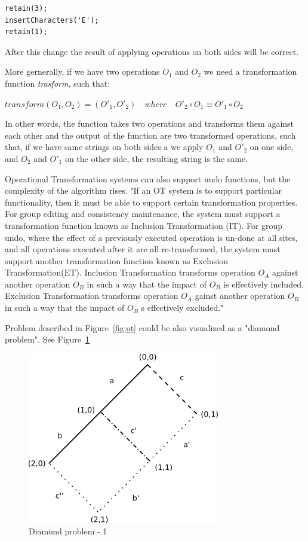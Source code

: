 \documentclass[12pt,oneside]{fithesis2}
\begin{document}
\vspace{3mm}
\begin{verbatim}
retain(3);
insertCharacters('E');
retain(1);
\end{verbatim}
\vspace{3mm}
After this change the result of applying operations on both sides will be correct.\par More gernerally, if we have two operations \(O_{1}\) and  \(O_{2}\) we need a transformation function \textit{trasform}, such that: 
\begin{center}
\(transform(O_{1},O_{2}) = (O'_{1},O'_{2}) \quad where \quad O'_{2} \circ O_{1} \equiv O'_{1} \circ O_{2} \) 
\end{center}
In other words, the function takes two operations and transforms them against each other and the output of the function are two transformed operations, such that, if we have same strings on both sides a we apply \( O_{1} \) and \(O'_{2}\) on one side, and \( O_{2} \) and  \( O'_{1} \) on the other side, the resulting string is the same. 
\par Operational Transformation systems can also support undo functions, but the complexity of the algorithm rises. "If an OT system is to support particular functionality, then it must be able to support certain transformation properties. For group editing and consistency maintenance, the system must support a transformation function known as Inclusion Transformation (IT). For group undo, where the effect of a previously executed operation is un-done at all sites, and all operations executed after it are all re-transformed, the system must support another transformation function known as Exclusion Transformation(ET). Inclusion Transformation transforms operation \( O_{A} \) against another operation \( O_{B} \) in such a way that the impact of \( O_{B} \) is effectively included. Exclusion Transformation transforms operation \( O_{A} \) gainst another operation \( O_{B} \) in such a way that the impact of \( O_{B} \) s effectively excluded." \cite{Leung} 
\par Problem described in Figure~\ref{fig:ot} could be also visualized as a "diamond problem". See Figure~\ref{fig:diamond1}
\begin{figure}[H]
\caption{Diamond problem - 1}
\label{fig:diamond1}
\centering
\vspace{5mm}
\includegraphics{diamond1}
\end{figure}
\end{document}
